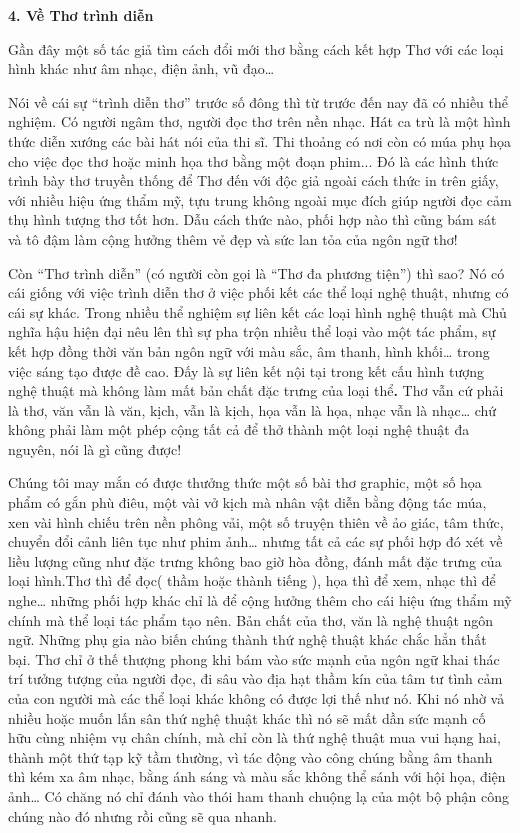 \documentclass[../main.tex]{subfiles}
\begin{document}
\begin{multicols}{2}
 
\textbf{4.  Về Thơ trình diễn} 
 
Gần đây một số tác giả tìm cách đổi mới thơ bằng cách kết hợp Thơ với các loại hình khác như âm nhạc, điện ảnh, vũ đạo…  
 
Nói về cái sự “trình diễn thơ” trước số đông thì từ trước đến nay đã có nhiều thể nghiệm. Có người ngâm thơ, người đọc thơ trên nền nhạc. Hát ca trù là một hình thức diễn xướng các bài hát nói của thi sĩ. Thi thoảng có nơi còn có múa phụ họa cho việc đọc thơ hoặc minh họa thơ bằng một đoạn phim... Đó là các hình thức trình bày thơ truyền thống để Thơ đến với độc giả  ngoài cách thức in trên giấy, với nhiều hiệu ứng thẩm mỹ, tựu trung không ngoài mục đích giúp người đọc cảm thụ hình tượng thơ tốt hơn. Dẫu cách thức nào, phối hợp nào thì cũng bám sát và  tô đậm làm cộng hưởng thêm vẻ đẹp và sức lan tỏa của ngôn ngữ thơ! 
 
Còn “Thơ trình diễn” (có người còn gọi là “Thơ đa phương tiện”) thì sao? Nó có cái giống với việc trình diễn thơ ở việc phối kết các thể loại nghệ thuật, nhưng có cái sự khác. Trong nhiều thể nghiệm sự liên kết các loại hình nghệ thuật mà Chủ nghĩa hậu hiện đại nêu lên thì sự pha trộn nhiều thể loại vào một tác phẩm, sự kết hợp đồng thời văn bản ngôn ngữ với màu sắc, âm thanh, hình khối… trong việc sáng tạo được đề cao. Đấy là sự liên kết nội tại trong kết cấu hình tượng nghệ thuật mà không làm mất bản chất đặc trưng của loại thể\textbf{.} Thơ vẫn cứ phải là thơ, văn vẫn là văn, kịch, vẫn là kịch, họa vẫn là họa, nhạc vẫn là nhạc… chứ không phải làm một phép cộng tất cả để thở thành một loại nghệ thuật đa nguyên, nói là gì cũng được! 
 
Chúng tôi may mắn có được thưởng thức một số bài thơ graphic, một số họa phẩm có gắn phù điêu, một vài vở kịch mà nhân vật diễn bằng động tác múa, xen vài hình chiếu trên nền phông vải, một số truyện thiên về ảo giác, tâm thức, chuyển đổi cảnh liên tục như phim ảnh… nhưng tất cả các sự phối hợp đó xét về liều lượng cũng như đặc trưng không bao giờ hòa đồng, đánh mất đặc trưng của loại hình.Thơ thì để đọc( thầm hoặc thành tiếng ), họa thì để xem, nhạc thì để nghe… những phối hợp khác chỉ là để cộng hưởng thêm cho cái hiệu ứng thẩm mỹ chính mà thể loại tác phẩm tạo nên. Bản chất của thơ, văn là nghệ thuật ngôn ngữ. Những phụ gia nào biến chúng thành thứ nghệ thuật khác chắc hẳn thất bại. Thơ chỉ ở thế thượng phong khi bám vào sức mạnh của ngôn ngữ khai thác trí tưởng tượng của người đọc, đi sâu vào địa hạt thầm kín của tâm tư tình cảm của con người mà các thể loại khác không có được lợi thế như nó. Khi nó nhờ vả nhiều hoặc muốn lấn sân thứ nghệ thuật khác thì nó sẽ mất dần sức mạnh cố hữu cùng  nhiệm vụ chân chính, mà chỉ còn là thứ nghệ thuật mua vui hạng hai, thành một thứ tạp kỹ tầm thường, vì tác động vào công chúng bằng âm thanh thì kém xa âm nhạc, bằng ánh sáng và màu sắc không thể sánh với hội họa, điện ảnh… Có chăng nó chỉ đánh vào thói ham thanh chuộng lạ của một bộ phận công chúng nào đó nhưng rồi cũng sẽ qua nhanh. 
 

\end{multicols}
\end{document}

